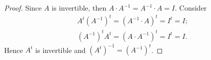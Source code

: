 \begin{Exercise}
\begin{proof}
Since $A$ is invertible, then $A\cdot A^{-1} = A^{-1}\cdot A = I$. Consider 
\begin{align*}
A^t(A^{-1})^t = (A^{-1}\cdot A)^t = I^t = I; \\
(A^{-1})^t A^t= (A\cdot A^{-1})^t = I^t = I.
\end{align*}
Hence $A^t$ is invertible and $(A^t)^{-1} = (A^{-1})^t$.
\end{proof}
\end{Exercise}